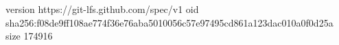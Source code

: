 version https://git-lfs.github.com/spec/v1
oid sha256:f08de9ff108ae774f36e76aba5010056c57e97495cd861a123dac010a0f0d25a
size 174916
